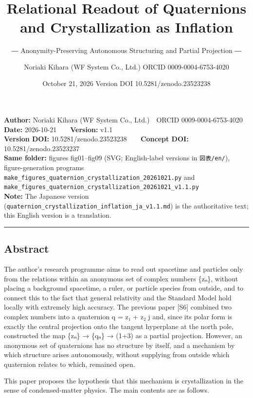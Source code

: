 \documentclass[
  a4paper,
]{article}
\title{Relational Readout of Quaternions and Crystallization as
Inflation}
\subtitle{― Anonymity-Preserving Autonomous Structuring and Partial
Projection ―}
\author{Noriaki Kihara (WF System Co., Ltd.) ORCID 0009-0004-6753-4020}
\date{October 21, 2026 Version DOI 10.5281/zenodo.23523238}
\begin{document}
\maketitle

\textbf{Author:} Noriaki Kihara (WF System Co., Ltd.)　ORCID
0009-0004-6753-4020\\
\textbf{Date:} 2026-10-21　　\textbf{Version:} v1.1\\
\textbf{Version DOI:} 10.5281/zenodo.23523238　　\textbf{Concept DOI:}
10.5281/zenodo.23523237\\
\textbf{Same folder:} figures fig01--fig09 (SVG; English-label versions
in \texttt{図表/\allowbreak{}en/\allowbreak{}}), figure-generation programs
\texttt{make\_\allowbreak{}figures\_\allowbreak{}quaternion\_\allowbreak{}crystallization\_\allowbreak{}20261021.py} and
\texttt{make\_\allowbreak{}figures\_\allowbreak{}quaternion\_\allowbreak{}crystallization\_\allowbreak{}20261021\_\allowbreak{}v1.1.py}\\
\textbf{Note:} The Japanese version
(\texttt{quaternion\_\allowbreak{}crystallization\_\allowbreak{}inflation\_\allowbreak{}ja\_\allowbreak{}v1.1.md}) is the
authoritative text; this English version is a translation.

\begin{center}\rule{0.5\linewidth}{0.5pt}\end{center}

\subsection{Abstract}\label{abstract}

The author's research programme aims to read out spacetime and particles
only from the relations within an anonymous set of complex numbers
\{zₙ\}, without placing a background spacetime, a ruler, or particle
species from outside, and to connect this to the fact that general
relativity and the Standard Model hold locally with extremely high
accuracy. The previous paper {[}S6{]} combined two complex numbers into
a quaternion q = z₁ + z₂ j and, since its polar form is exactly the
central projection onto the tangent hyperplane at the north pole,
constructed the map \{zₙ\} → \{qₙ\} → (1+3) as a partial projection.
However, an anonymous set of quaternions has no structure by itself, and
a mechanism by which structure arises autonomously, without supplying
from outside which quaternion relates to which, remained open.

This paper proposes the hypothesis that this mechanism is
crystallization in the sense of condensed-matter physics. The main
contents are as follows.
\end{document}
